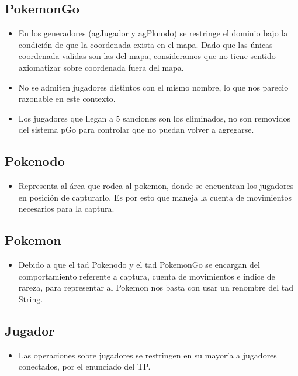 
\subsection{PokemonGo}

\begin{itemize}
\item{En los generadores (agJugador y agPknodo) se restringe el dominio bajo la condici\'on de que la coordenada exista en el mapa. Dado que las \'unicas coordenada validas son las del mapa, consideramos que no tiene sentido axiomatizar sobre coordenada fuera del mapa.}

\item{No se admiten jugadores distintos con el mismo nombre, lo que nos parecio razonable en este contexto.}

\item{Los jugadores que llegan a 5 sanciones son los eliminados, no son removidos del sistema pGo para controlar que no puedan volver a agregarse.}

\end{itemize}


\subsection{Pokenodo}

\begin{itemize}
\item{Representa al \'area que rodea al pokemon, donde se encuentran los jugadores en posici\'on de capturarlo. Es por esto que maneja la cuenta de movimientos necesarios para la captura.}
\end{itemize}

\subsection{Pokemon}

\begin{itemize}
\item{Debido a que el tad Pokenodo y el tad PokemonGo se encargan del comportamiento referente a captura, cuenta de movimientos e \'indice de rareza, para representar al Pokemon nos basta con usar un renombre del tad String.}
\end{itemize}

\subsection{Jugador}

\begin{itemize}
\item{Las operaciones sobre jugadores se restringen en su mayor\'ia a jugadores conectados, por el enunciado del TP.}
\end{itemize}

